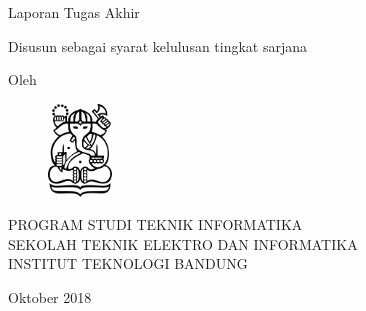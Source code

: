 \clearpage
\pagestyle{empty}

\begin{center}
\smallskip

    \Large \bfseries \MakeUppercase{\thetitle}
    \vfill

    \Large Laporan Tugas Akhir
    \vfill

    \large Disusun sebagai syarat kelulusan tingkat sarjana

    \vfill

    \large Oleh

    \Large \theauthor

    \vfill
    \begin{figure}[h]
        \centering
      	\includegraphics[width=0.15\textwidth]{resources/cover-ganesha}
    \end{figure}
    \vfill

    \large
    \uppercase{
        Program Studi Teknik Informatika \\
        Sekolah Teknik Elektro dan Informatika \\
        Institut Teknologi Bandung
    }

    Oktober 2018

\end{center}

\clearpage
